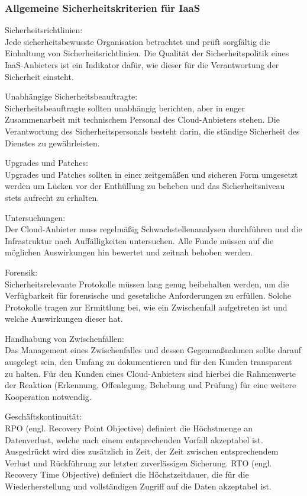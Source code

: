 \documentclass[12pt,a4paper,bibliography=totocnumbered,listof=totocnumbered]{scrartcl}
\begin{document}
\subsubsection{Allgemeine Sicherheitskriterien für IaaS}
\begin{compactitem}
\item Sicherheitsrichtlinien:\\
Jede sicherheitsbewusste Organisation betrachtet und prüft sorgfältig die Einhaltung von Sicherheitsrichtlinien. Die Qualität der Sicherheitspolitik eines IaaS-Anbieters ist ein Indikator dafür, wie dieser für die Verantwortung der Sicherheit einsteht.
\item Unabhängige Sicherheitsbeauftragte:\\
Sicherheitsbeauftragte sollten unabhängig berichten, aber in enger Zusammenarbeit mit technischem Personal des Cloud-Anbieters stehen. Die Verantwortung des Sicherheitspersonals besteht darin, die ständige Sicherheit des Dienstes zu gewährleisten.
\item Upgrades und Patches:\\
Upgrades und Patches sollten in einer zeitgemäßen und sicheren Form umgesetzt werden um Lücken vor der Enthüllung zu beheben und das Sicherheitsniveau stets aufrecht zu erhalten.
\item Untersuchungen:\\
Der Cloud-Anbieter muss regelmäßig Schwachstellenanalysen durchführen und die Infrastruktur nach Auffälligkeiten untersuchen. Alle Funde müssen auf die möglichen Auswirkungen hin bewertet und zeitnah behoben werden.
\item Forensik:\\
Sicherheitsrelevante Protokolle müssen lang genug beibehalten werden, um die Verfügbarkeit für forensische und gesetzliche Anforderungen zu erfüllen. Solche Protokolle tragen zur Ermittlung bei, wie ein Zwischenfall aufgetreten ist und welche Auswirkungen dieser hat.
\item Handhabung von Zwischenfällen:\\
Das Management eines Zwischenfalles und dessen Gegenmaßnahmen sollte darauf ausgelegt sein, den Umfang zu dokumentieren und für den Kunden transparent zu halten. Für den Kunden eines Cloud-Anbieters sind hierbei die Rahmenwerte der Reaktion (Erkennung, Offenlegung, Behebung und Prüfung) für eine weitere Kooperation notwendig.
\item Geschäftskontinuität:\\
RPO (engl. Recovery Point Objective) definiert die Höchstmenge an Datenverlust, welche nach einem entsprechenden Vorfall akzeptabel ist. Ausgedrückt wird dies zusätzlich in Zeit, der Zeit zwischen entsprechendem Verlust und Rückführung zur letzten zuverlässigen Sicherung. RTO (engl. Recovery Time Objective) definiert die Höchstzeitdauer, die für die Wiederherstellung und vollständigen Zugriff auf die Daten akzeptabel ist.
\end{compactitem}
\cite[TODO S.]{38}
\end{document}
